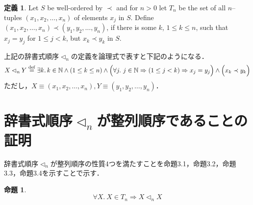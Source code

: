 \documentclass[11pt,dvipdfmx]{jarticle}
\theoremstyle{definition}
\newtheorem{definition}{定義}[section]
\newtheorem{proposition}{命題}[section]
\begin{document}
\begin{definition}
Let $S$ be well-ordered by $\prec$ and for $n > 0$ let $T_{n}$ be the set of all $n$--tuples $(x_{1}, x_{2}, \dots , x_{n})$ of elements $x_{j}$ in $S$. Define $(x_{1}, x_{2}, \dots, x_{n}) \prec (y_{1}, y_{2}, \dots, y_{n})$, if there is some $k$, $1 \leq k \leq n$, such that $x_{j} = y_{j}$ for $1 \leq j < k$, but $x_{k} \prec y_{k}$ in $S$. 
 \label{dfn:lex}
\end{definition}
上記の辞書式順序$\lhd_{n}$の定義を論理式で表すと下記のようになる．
\begin{equation}
X \lhd_{n} Y \overset{\mathrm{def}}{=} \exists k. \, k \in \mathbb{N} \land (1 \leq k \leq n) \land \Bigl( \forall j. \ j \in \mathbb{N} \Rightarrow (1 \leq j < k) \Rightarrow  x_{j} = y_{j} \Bigr) \land \Bigl( x_{k} \prec y_{k} \Bigr)
\end{equation}
ただし，$X \equiv (x_{1}, x_{2}, \dots, x_{n}), Y \equiv (y_{1}, y_{2}, \dots, y_{n})$．

\section{辞書式順序$\lhd_{n}$が整列順序であることの証明}
辞書式順序$\lhd_{n}$が整列順序の性質4つを満たすことを命題3.1，命題3.2，命題3.3，命題3.4を示すことで示す．

\begin{proposition}
\[
\forall X. \ X \in T_{n} \Rightarrow X \lhd_{n} X
\]
\end{proposition}
\end{document}

